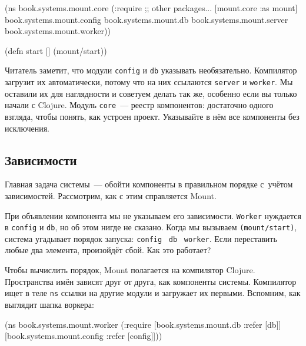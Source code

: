 \label{mount-main}

\begin{english}
  \begin{clojure}
(ns book.systems.mount.core
  (:require
   ;; other packages...
   [mount.core :as mount]
   book.systems.mount.config
   book.systems.mount.db
   book.systems.mount.server
   book.systems.mount.worker))

(defn start []
  (mount/start))
  \end{clojure}
\end{english}

Читатель заметит, что модули \verb|config| и \verb|db| указывать
необязательно. Компилятор загрузит их автоматически, потому что на них ссылаются
\verb|server| и \verb|worker|. Мы оставили их для наглядности и советуем делать
так же, особенно если вы только начали с Clojure. Модуль \verb|core|~--- реестр
компонентов: достаточно одного взгляда, чтобы понять, как устроен
проект. Указывайте в нём все компоненты без исключения.

\subsection{Зависимости}


Главная задача системы~--- обойти компоненты в правильном порядке с~учётом
зависимостей. Рассмотрим, как с этим справляется Mount.

При объявлении компонента мы не указываем его зависимости. \verb|Worker|
нуждается в \verb|config| и \verb|db|, но об этом нигде не сказано. Когда мы
вызываем \verb|(mount/start)|, система угадывает порядок запуска:
\verb|config|~\arr{} \verb|db|~\arr{} \verb|worker|. Если переставить любые два
элемента, произойдёт сбой. Как это работает?

Чтобы вычислить порядок, Mount полагается на компилятор Clojure. Пространства
имён зависят друг от друга, как компоненты системы. Компилятор ищет в теле
\verb|ns| ссылки на другие модули и загружает их первыми. Вспомним, как выглядит
шапка воркера:


\begin{english}
  \begin{clojure}
(ns book.systems.mount.worker
  (:require
   [book.systems.mount.db :refer [db]]
   [book.systems.mount.config :refer [config]]))
  \end{clojure}
\end{english}

